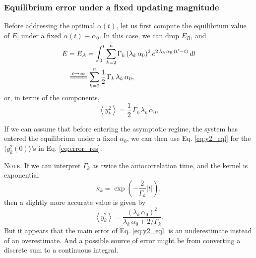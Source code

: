 \documentclass[reprint]{revtex4-1}
\newcommand{\note}[1]{{\color{DarkGreen}\footnotesize \textsc{Note.} #1}}
\newcommand{\Err}{E}
\begin{document}
\subsubsection{\label{eq:eqlerr}
Equilibrium error under a fixed updating magnitude
}


Before addressing the optimal $\alpha(t)$,
let us first compute the equilibrium value of $\Err$,
under a fixed $\alpha(t) \equiv \alpha_0$.
%
In this case, we can drop $\Err_R$, and
%
\begin{align}
  \Err
  &=
  \Err_A
  =
  \int_0^t
    \sum_{k = 2}^n
      \Gamma_k \, (\lambda_k \, \alpha_0)^2 \,
      e^{ 2 \, \lambda_k \, \alpha_0 \, (t' - t) }
    \, dt
  \notag
  \\
  &
  \stackrel{ t \to \infty }
  { =\joinrel=\joinrel=\joinrel= }
  \sum_{ k = 2 }^n
    \frac 1 2 \, \Gamma_k \, \lambda_k \, \alpha_0,
  \label{eq:error_eql}
\end{align}
%
or, in terms of the components,
%
\begin{equation}
  \left\langle
    y_k^2
  \right\rangle
  =
  \frac 1 2 \, \Gamma_k \, \lambda_k \, \alpha_0,
  \label{eq:y2_eql}
\end{equation}
%

If we can assume that before entering the asymptotic regime,
the system has entered the equilibrium under a fixed $\alpha_0$,
we can then use Eq. \eqref{eq:y2_eql}
for the $\langle y_k^2(0) \rangle$'s in Eq. \eqref{eq:error_res}.

\note{If we can interpret $\Gamma_k$ as twice the autocorrelation time,
  and the kernel is exponential
  $$
  \kappa_k = \exp\left( - \frac{2}{\Gamma_k} |t| \right),
  $$
  then a slightly more accurate value is given by\cite{vankampen}
  $$
  \left\langle
    y_k^2
  \right\rangle
  =
  \frac{      ( \lambda_k \, \alpha_0 )^2     }
       { \lambda_k \, \alpha_0 + 2 / \Gamma_k }.
  $$
  But it appears that the main error of Eq. \eqref{eq:y2_eql}
  is an underestimate instead of an overestimate.
  And a possible source of error might be from
  converting a discrete sum to a continuous integral.
}

%
%
\end{document}

